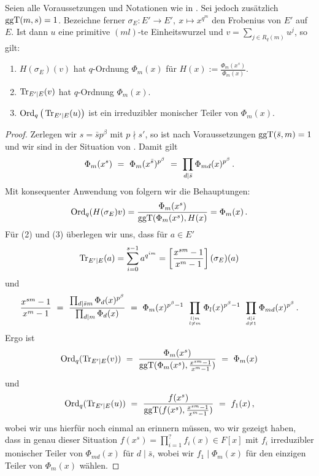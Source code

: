 \begin{satz}
  \label{satz:q_ordnung_von_trace}
  Seien alle Voraussetzungen und Notationen wie in 
  .
  Sei jedoch zusätzlich $\operatorname{ggT}(m,s) = 1$.
  Bezeichne ferner 
  $\sigma_E: E'\to E',\ x \mapsto x^{q^m}$ den Frobenius von $E'$ auf $E$.
  Ist dann $u$ eine primitive $(ml)$-te Einheitswurzel
  und $v = \sum_{j\in R_q(m)} u^j$, so gilt:
  \begin{enumerate}
    \item $H(\sigma_E)(v)$ hat $q$-Ordnung $\Phi_m(x)$ für 
      $H(x) := \frac{\Phi_m(x^s)}{\Phi_m(x)}$.
    \item $\operatorname{Tr}_{E'\mid E}(v)$ hat $q$-Ordnung $\Phi_m(x)$.
    \item $\operatorname{Ord}_q\big(\operatorname{Tr}_{E'\mid E}(u)\big)$ ist ein irreduzibler 
      monischer Teiler von $\Phi_m(x)$.
  \end{enumerate}
\end{satz}
\begin{proof}
  Zerlegen wir $s = \bar s p^\beta$ mit $p\nmid s'$, so ist 
  nach Voraussetzungen $\operatorname{ggT}(\bar s, m) = 1$ und wir sind in der Situation von
  \thref{}. Damit gilt
  \[ \Phi_m(x^s) \ =\  \Phi_m(x^{\bar s})^{p^\beta}
    \ =\  \prod_{d \mid \bar s} \Phi_{md}(x)^{p^\beta}\,.\]
  Mit konsequenter Anwendung von 
  folgern wir die Behauptungen:
  \[ \operatorname{Ord}_q(H(\sigma_E)v) = \frac{\Phi_m(x^s)}{\operatorname{ggT}(\Phi_m(x^s), H(x)}
    = \Phi_m(x)\,.\]
  Für (2) und (3) überlegen wir uns, dass für $a \in E'$
  \[ \operatorname{Tr}_{E'\mid E}(a) = \sum_{i=0}^{s-1} a^{q^{im}} = 
    \left[\frac{x^{sm}-1}{x^m-1}\right](\sigma_E)(a)\]
  und 
  \[ \frac{x^{sm} -1}{x^m-1} \speq= 
    \frac{ \prod_{d\mid \bar sm} \Phi_d(x)^{p^\beta}}{
      \prod_{d\mid m} \Phi_d(x)} \speq=
    \Phi_m(x)^{p^\beta-1}\ 
    \prod_{l\mid m\atop l\neq m} \Phi_l(x)^{p^\beta-1}\ 
    \prod_{d\mid \bar s\atop d\neq 1} \Phi_{md}(x)^{p^\beta} \,.\]
  Ergo ist
  \[ \operatorname{Ord}_q(\operatorname{Tr}_{E'\mid E}(v)) \ =\  
    \frac{\Phi_m(x^s)}{\operatorname{ggT}(\Phi_m(x^s), \frac{x^{sm}-1}{x^m-1})}
    \ =\  \Phi_m(x)\]
  und
  \[ \operatorname{Ord}_q(\operatorname{Tr}_{E'\mid E}(u)) \ =\  
    \frac{f(x^s)}{\operatorname{ggT}(f(x^s), \frac{x^{sm}-1}{x^m-1})} \ =\  f_1(x) \,,\]
  wobei wir uns hierfür noch einmal an  
  erinnern müssen, wo wir gezeigt haben, dass in genau dieser Situation 
  $f(x^s) = \prod_{i=1}^? f_i(x) \in F[x]$ mit $f_i$ irreduzibler monischer 
  Teiler von $\Phi_{md}(x)$ für $d\mid \bar s$, wobei wir \obda 
  $f_1 \mid \Phi_m(x)$ für den einzigen Teiler von $\Phi_m(x)$ wählen.
\end{proof}


